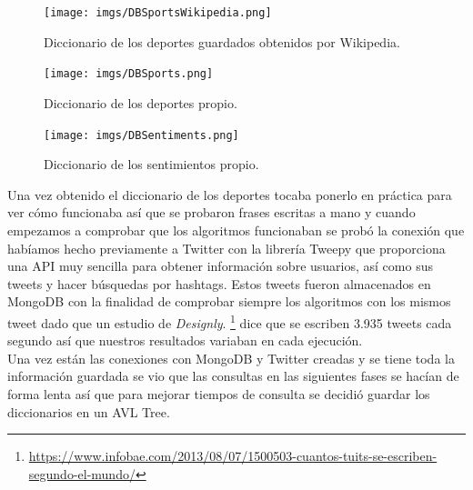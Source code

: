 \documentclass[../all.tex]{subfiles}
\begin{document}
	\begin{figure}[H]
		\centering
		\texttt{[image: imgs/DBSportsWikipedia.png]}
		\caption{Diccionario de los deportes guardados obtenidos por Wikipedia.}
	\end{figure}
	\begin{figure}[H]
		\centering
		\texttt{[image: imgs/DBSports.png]}
		\caption{Diccionario de los deportes propio.}
	\end{figure}

	\begin{figure}[H]
		\centering
		\texttt{[image: imgs/DBSentiments.png]}
		\caption{Diccionario de los sentimientos propio.}
	\end{figure}

	Una vez obtenido el diccionario de los deportes tocaba ponerlo en práctica para ver cómo funcionaba así que se probaron frases escritas a mano y cuando empezamos a comprobar que los algoritmos funcionaban se probó la conexión que habíamos hecho previamente a Twitter con la librería Tweepy que proporciona una API muy sencilla para obtener información sobre usuarios, así como sus tweets y hacer búsquedas por hashtags. Estos tweets fueron almacenados en MongoDB con la finalidad de comprobar siempre los algoritmos con los mismos tweet dado que un estudio de \textit{Designly}. \footnote{\url{https://www.infobae.com/2013/08/07/1500503-cuantos-tuits-se-escriben-segundo-el-mundo/}} dice que se escriben 3.935 tweets cada segundo así que nuestros resultados variaban en cada ejecución.\\
	
	Una vez están las conexiones con MongoDB y Twitter creadas y se tiene toda la información guardada se vio que las consultas en las siguientes fases se hacían de forma lenta así que para mejorar tiempos de consulta se decidió guardar los diccionarios en un AVL Tree. \\
	
\end{document}
